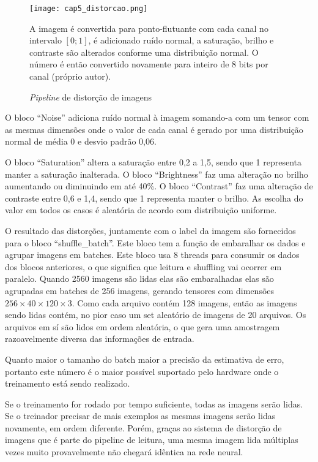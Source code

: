 \begin{figure}[!htb]
	\centering
	\texttt{[image: cap5\_distorcao.png]}
	\caption{\emph{Pipeline} de distorção de imagens}
	\label{fig:cap5_distorcao}
	A imagem é convertida para ponto-flutuante com cada canal no intervalo
	$[0;1]$, é adicionado ruído normal, a saturação, brilho e contraste são
	alterados conforme uma distribuição normal. O número é então convertido
	novamente para inteiro de 8 bits por canal (próprio autor).
\end{figure}

O bloco “Noise” adiciona ruído normal à imagem somando-a com um tensor com as
mesmas dimensões onde o valor de cada canal é gerado por uma distribuição
normal de média 0 e desvio padrão 0,06.

O bloco “Saturation” altera a saturação entre 0,2 a 1,5, sendo que 1 representa
manter a saturação inalterada. O bloco “Brightness” faz uma alteração no brilho
aumentando ou diminuindo em até 40\%. O bloco “Contrast” faz uma alteração de
contraste entre 0,6 e 1,4, sendo que 1 representa manter o brilho. As escolha
do valor em todos os casos é aleatória de acordo com distribuição uniforme.

O resultado das distorções, juntamente com o label da imagem são fornecidos
para o bloco “shuffle\_batch”. Este bloco tem a função de embaralhar os
dados e agrupar imagens em batches. Este bloco usa 8 threads para consumir
os dados dos blocos anteriores, o que significa que leitura e shuffling vai
ocorrer em paralelo. Quando 2560 imagens são lidas elas são embaralhadas
elas são agrupadas em batches de 256 imagens, gerando tensores com
dimensões $256 \times 40 \times 120 \times 3$. Como cada arquivo contém
128 imagens, então as imagens
sendo lidas contém, no pior caso um set aleatório de imagens de 20
arquivos. Os arquivos em sí são lidos em ordem aleatória, o que gera uma
amostragem razoavelmente diversa das informações de entrada.

Quanto maior o tamanho do batch maior a precisão da estimativa de erro,
portanto este número é o maior possível suportado pelo hardware onde o
treinamento está sendo realizado.

Se o treinamento for rodado por tempo suficiente, todas as imagens serão
lidas. Se o treinador precisar de mais exemplos as mesmas imagens serão lidas
novamente, em ordem diferente. Porém, graças ao sistema de distorção de
imagens que é parte do pipeline de leitura, uma mesma imagem lida múltiplas
vezes muito provavelmente não chegará idêntica na rede neural.

